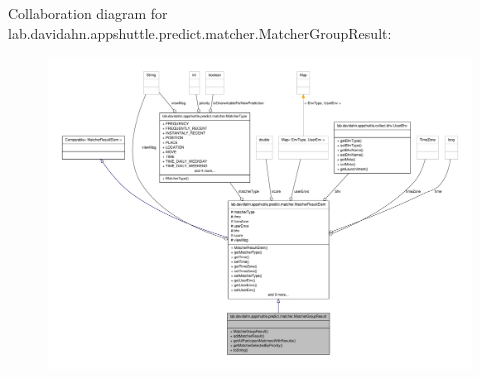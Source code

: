 \-Collaboration diagram for lab.\-davidahn.\-appshuttle.\-predict.\-matcher.\-Matcher\-Group\-Result\-:
\nopagebreak
\begin{figure}[H]
\begin{center}
\leavevmode
\includegraphics[width=350pt]{classlab_1_1davidahn_1_1appshuttle_1_1predict_1_1matcher_1_1_matcher_group_result__coll__graph}
\end{center}
\end{figure}
